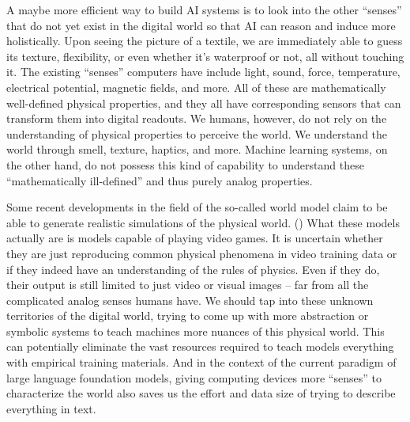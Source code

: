 \documentclass[12pt]{article}
\begin{document}
A maybe more efficient way to build AI systems is to look into the other ``senses'' that do not yet exist in the digital world so that AI can reason and induce more holistically. Upon seeing the picture of a textile, we are immediately able to guess its texture, flexibility, or even whether it's waterproof or not, all without touching it. The existing ``senses'' computers have include light, sound, force, temperature, electrical potential, magnetic fields, and more. All of these are mathematically well-defined physical properties, and they all have corresponding sensors that can transform them into digital readouts. We humans, however, do not rely on the understanding of physical properties to perceive the world. We understand the world through smell, texture, haptics, and more. Machine learning systems, on the other hand, do not possess this kind of capability to understand these ``mathematically ill-defined'' and thus purely analog properties. 

Some recent developments in the field of the so-called world model claim to be able to generate realistic simulations of the physical world. (\cite{bruce2024geniegenerativeinteractiveenvironments,gupta2022maskvitmaskedvisualpretraining}) What these models actually are is models capable of playing video games. It is uncertain whether they are just reproducing common physical phenomena in video training data or if they indeed have an understanding of the rules of physics. Even if they do, their output is still limited to just video or visual images -- far from all the complicated analog senses humans have. We should tap into these unknown territories of the digital world, trying to come up with more abstraction or symbolic systems to teach machines more nuances of this physical world. This can potentially eliminate the vast resources required to teach models everything with empirical training materials. And in the context of the current paradigm of large language foundation models, giving computing devices more ``senses'' to characterize the world also saves us the effort and data size of trying to describe everything in text.  
\end{document}
